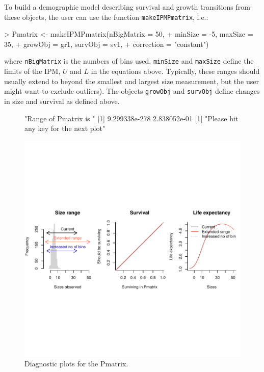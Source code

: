 \documentclass{article}
\begin{document}
To build a demographic model describing survival and growth transitions from these objects, the user can use the function {\tt makeIPMPmatrix}, i.e.: 
\begin{Schunk}
\begin{Sinput}
> Pmatrix <- makeIPMPmatrix(nBigMatrix = 50, 
+                             minSize = -5, maxSize = 35, 
+                             growObj = gr1, survObj = sv1, 
+                             correction = "constant")
\end{Sinput}
\end{Schunk}
where {\tt nBigMatrix} is the numbers of bins used, {\tt minSize} and
{\tt maxSize} define the limits of the IPM, $U$ and $L$ in the
equations above. Typically, these ranges should usually extend to beyond the
smallest and largest size measurement, but the user might want to exclude
outliers). The objects {\tt growObj} and {\tt survObj} define changes in size
and survival as defined above. 

\begin{figure}
\begin{center}
\begin{Schunk}
\begin{Soutput}
[1] "Range of Pmatrix is "
[1] 9.299338e-278  2.838052e-01
[1] "Please hit any key for the next plot"
\end{Soutput}
\end{Schunk}
\includegraphics{IPMpack_vignette-triDiag}
\end{center}
\caption{Diagnostic plots for the Pmatrix.}
\label{fig:triDiag}
\end{figure}
\end{document}
